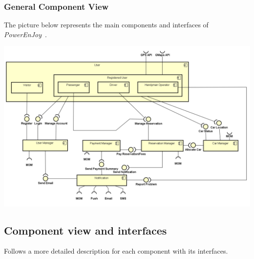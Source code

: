 \documentclass{article}
\newcommand{\pej}{\mbox{\normalfont\itshape PowerEnJoy }}
\begin{document}
			\subsubsection{General Component View}
			The picture below represents the main components and interfaces of \pej.
			\begin{center}
				\includegraphics[width=0.9\linewidth]{"img/component-view"}
			\end{center}
			\pagebreak
		
		\subsection{Component view and interfaces}
		Follows a more detailed description for each component with its interfaces.
\end{document}
